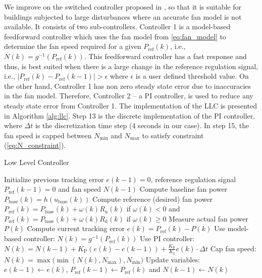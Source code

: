 We improve on the switched controller proposed in \cite{Vrettos:2016flexlab1}, so that it is suitable for buildings subjected to large disturbances where an accurate fan model is not available. 
It consists of two sub-controllers. 
Controller 1 is a model-based feedforward controller which uses the fan model from \eqref{eq:fan_model} to determine the fan speed required for a given $P_{\text{ref}}(k)$, i.e., $N(k) = g^{-1}(P_{\text{ref}}(k))$. 
This feedforward controller has a fast response and thus, is best suited when there is a large change in the reference regulation signal, i.e., $|P_{\text{ref}}(k) - P_{\text{ref}}(k-1)|>\epsilon$ where $\epsilon$ is a user defined threshold value. 
On the other hand, Controller 1 has non zero steady state error due to inaccuracies in the fan model. 
Therefore, Controller 2 -- a PI controller, is used to reduce any steady state error from Controller 1. 
The implementation of the LLC is presented in Algorithm \ref{alg:llc}.
Step 13 is the discrete implementation of the PI controller, where $\Delta t$ is the discretization time step (4 seconds in our case).
In step 15, the fan speed is capped between $N_\text{min}$ and $N_\text{max}$ to satisfy constraint (\ref{eq:N_constraint}).

\begin{algorithm}
\caption{Low Level Controller}
\label{alg:llc}
\begin{algorithmic}[1]
\State Initialize previous tracking error $e(k-1) = 0$, reference regulation signal $P_{\text{ref}}(k-1)=0$ and fan speed $N(k-1)$ 
	\State Compute baseline fan power $P_{\text{base}}(k) = h(u_{\text{base}}(k))$
	\State Compute reference (desired) fan power $P_{\text{ref}}(k) = P_{\text{base}}(k)+\omega(k) R_{\text{u}}(k)$ if $\omega(k)<0$ and $P_{\text{ref}}(k) = P_{\text{base}}(k)+\omega(k) R_{\text{d}}(k)$ if $\omega(k) \geq0$
	\State Measure actual fan power $P(k)$
	\State Compute current tracking error $e(k) = P_{\text{ref}}(k) - P(k)$ 
		\State Use model-based controller:
    		\State $N(k) = g^{-1}(P_{\text{ref}}(k))$
    	\Else
		\State Use PI controller:
        	\State $N(k) = N(k-1) + K_\text{P} (e(k)-e(k-1))+\frac{K_\text{P}}{K_\text{I}} e(k) \cdot \Delta t$	
    	\EndIf
	\State Cap fan speed: $N(k) = \max\big(\min(N(k),N_\text{max}),N_\text{min}\big)$
	\State Update variables: $e(k-1) \gets e(k)$, $P_{\text{ref}}(k-1) \gets P_{\text{ref}}(k)$ and $N(k-1) \gets N(k)$
\EndWhile
\end{algorithmic}
\end{algorithm}

